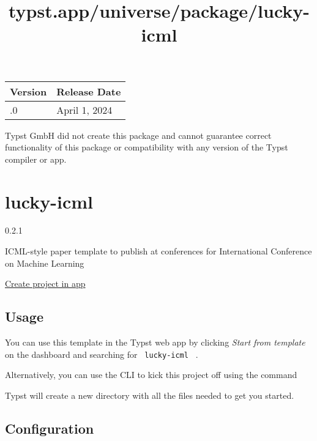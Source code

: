 \begin{longtable}[]{@{}ll@{}}
\toprule\noalign{}
Version & Release Date \\
\midrule\noalign{}
\endhead
\bottomrule\noalign{}
\endlastfoot
0.1.0 & April 1, 2024 \\
\end{longtable}

Typst GmbH did not create this package and cannot guarantee correct
functionality of this package or compatibility with any version of the
Typst compiler or app.


\title{typst.app/universe/package/lucky-icml}

\label{banner}
\label{template-thumbnail}

\section{lucky-icml}\label{lucky-icml}

{ 0.2.1 }

ICML-style paper template to publish at conferences for International
Conference on Machine Learning

\href{/app?template=lucky-icml&version=0.2.1}{Create project in app}

\label{readme}
\subsection{Usage}\label{usage}

You can use this template in the Typst web app by clicking \emph{Start
from template} on the dashboard and searching for
\texttt{\ lucky-icml\ } .

Alternatively, you can use the CLI to kick this project off using the
command

\begin{Shaded}
\begin{Highlighting}[]
\end{Highlighting}
\end{Shaded}

Typst will create a new directory with all the files needed to get you
started.

\subsection{Configuration}\label{configuration}

